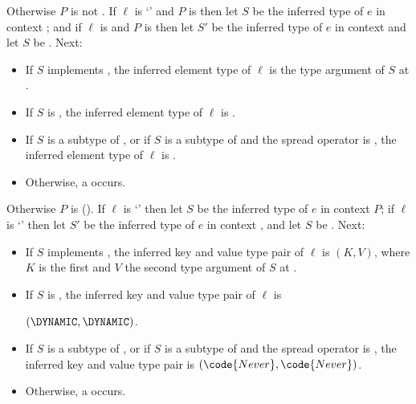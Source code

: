 \documentclass[makeidx]{article}
\begin{document}
{\noindent
{}%
Otherwise $P$ is not \FreeContext.
If $\ell$ is `' and $P$ is 
then let $S$ be the inferred type of $e$ in context ;
and if $\ell$ is  and $P$ is 
then let $S'$ be the inferred type of $e$ in context 
and let $S$ be .
Next:

\begin{itemize}
\item
  If $S$ implements ,
  the inferred element type of $\ell$ is
  the type argument of $S$ at .
\item
  If $S$ is \DYNAMIC,
  the inferred element type of $\ell$ is \DYNAMIC.
\item
  If $S$ is a subtype of ,
  or if $S$ is a subtype of  and the spread operator is ,
  the inferred element type of $\ell$ is .
\item
  Otherwise, a  occurs.
\end{itemize}

\noindent
{}%
Otherwise $P$ is 
().
If $\ell$ is `' then let $S$ be
the inferred type of $e$ in context $P$;
if $\ell$ is `' then let $S'$ be
the inferred type of $e$ in context ,
and let $S$ be .
Next:

\begin{itemize}
\item
  If $S$ implements ,
  the inferred key and value type pair of $\ell$ is $(K, V)$,
  where $K$ is the first and $V$ the second type argument of
  $S$ at .
\item
  If $S$ is \DYNAMIC,
  the inferred key and value type pair of $\ell$ is

  \noindent
  $(\DYNAMIC, \DYNAMIC)$.
\item
  If $S$ is a subtype of ,
  or if $S$ is a subtype of  and the spread operator is ,
  the inferred key and value type pair is $(\code{Never}, \code{Never})$.
\item
  Otherwise, a  occurs.
\end{itemize}
\vspace{-5mm}
\EndCase

}
\end{document}
